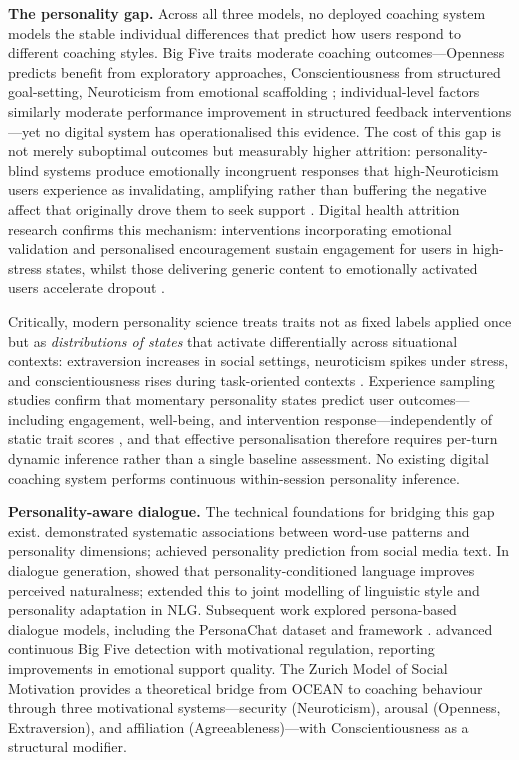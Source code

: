 \documentclass[10pt,a4paper]{report}
\begin{document}
\textbf{The personality gap.} Across all three models, no deployed coaching system models the stable individual differences that predict how users respond to different coaching styles. Big Five traits moderate coaching outcomes---Openness predicts benefit from exploratory approaches, Conscientiousness from structured goal-setting, Neuroticism from emotional scaffolding \citep{deHaan2013, Jones2016}; individual-level factors similarly moderate performance improvement in structured feedback interventions \citep{Smither2005}---yet no digital system has operationalised this evidence. The cost of this gap is not merely suboptimal outcomes but measurably higher attrition: personality-blind systems produce emotionally incongruent responses that high-Neuroticism users experience as invalidating, amplifying rather than buffering the negative affect that originally drove them to seek support \citep{Eysenbach2005}. Digital health attrition research confirms this mechanism: interventions incorporating emotional validation and personalised encouragement sustain engagement for users in high-stress states, whilst those delivering generic content to emotionally activated users accelerate dropout \citep{Beatty2022}.

Critically, modern personality science treats traits not as fixed labels applied once but as \emph{distributions of states} that activate differentially across situational contexts: extraversion increases in social settings, neuroticism spikes under stress, and conscientiousness rises during task-oriented contexts \citep{Fleeson2001}. Experience sampling studies confirm that momentary personality states predict user outcomes---including engagement, well-being, and intervention response---independently of static trait scores \citep{Fleeson2009}, and that effective personalisation therefore requires per-turn dynamic inference rather than a single baseline assessment. No existing digital coaching system performs continuous within-session personality inference.

\textbf{Personality-aware dialogue.} The technical foundations for bridging this gap exist. \citet{Yarkoni2010} demonstrated systematic associations between word-use patterns and personality dimensions; \citet{Park2015} achieved personality prediction from social media text. In dialogue generation, \citet{Mairesse2010} showed that personality-conditioned language improves perceived naturalness; \citet{Hu2018} extended this to joint modelling of linguistic style and personality adaptation in NLG. Subsequent work explored persona-based dialogue models, including the PersonaChat dataset and framework \citep{Zhang2018, Li2016, Zheng2019}. \citet{Devdas2025} advanced continuous Big Five detection with motivational regulation, reporting improvements in emotional support quality. The Zurich Model of Social Motivation \citep{Quirin2022, Quirin2023} provides a theoretical bridge from OCEAN to coaching behaviour through three motivational systems---security (Neuroticism), arousal (Openness, Extraversion), and affiliation (Agreeableness)---with Conscientiousness as a structural modifier.
\end{document}
